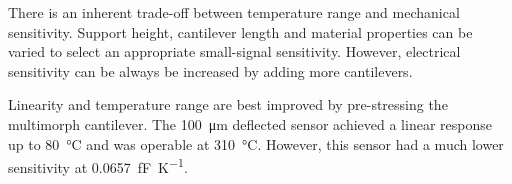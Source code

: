 \documentclass[a4paper,10pt,twocolumn]{article}
\begin{document}
There is an inherent trade-off between temperature range and mechanical
sensitivity. Support height, cantilever length and material properties can be
varied to select an appropriate small-signal sensitivity. However, electrical
sensitivity can be always be increased by adding more cantilevers.

Linearity and temperature range are best improved by pre-stressing the
multimorph cantilever. The \SI{100}{\micro\meter} deflected sensor achieved a
linear response up to \SI{80}{\celsius} and was operable at \SI{310}{\celsius}.
However, this sensor had a much lower sensitivity at
\SI{0.0657}{\femto\farad\per\kelvin}.

\printbibliography
\FloatBarrier
\end{document}
